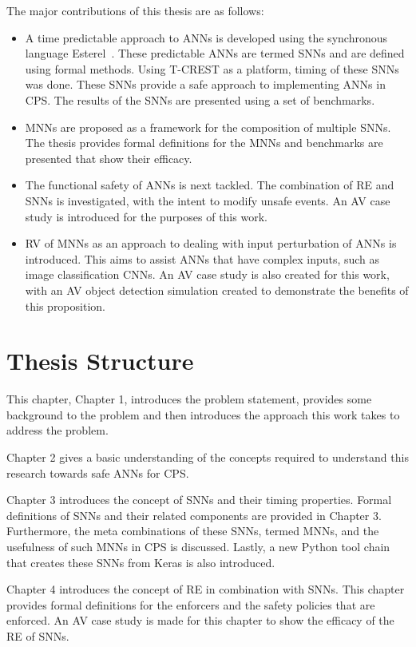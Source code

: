 The major contributions of this thesis are as follows:
\begin{itemize}
	\item A time predictable approach to \acp{ANN} is developed using the synchronous language Esterel~\cite{berry2000foundations}. These predictable \acp{ANN} are termed \acfp{SNN} and are defined using formal methods. Using T-CREST as a platform, timing of these \acp{SNN} was done. These \acp{SNN} provide a safe approach to implementing \acp{ANN} in \ac{CPS}. The results of the \acp{SNN} are presented using a set of benchmarks. 
	\item \acfp{MNN} are proposed as a framework for the composition of multiple \acp{SNN}. The thesis provides formal definitions for the \acp{MNN} and benchmarks are presented that show their efficacy. 
	\item The functional safety of \acp{ANN} is next tackled. The combination of \acf{RE} and \acp{SNN} is investigated, with the intent to modify unsafe events. An \acf{AV} case study is introduced for the purposes of this work.
	\item \acf{RV} of \acp{MNN} as an approach to dealing with input perturbation of \acp{ANN} is introduced. This aims to assist \acp{ANN} that have complex inputs, such as image classification \acfp{CNN}. An \ac{AV} case study is also created for this work, with an \ac{AV} object detection simulation created to demonstrate the benefits of this proposition. 
\end{itemize}

\section{Thesis Structure}
This chapter, Chapter 1, introduces the problem statement, provides some background to the problem and then introduces the approach this work takes to address the problem.

Chapter 2 gives a basic understanding of the concepts required to understand this research towards safe \acp{ANN} for \ac{CPS}.

Chapter 3 introduces the concept of \acfp{SNN} and their timing properties.
Formal definitions of \acp{SNN} and their related components are provided in Chapter 3.
Furthermore, the meta combinations of these \acp{SNN}, termed \acp{MNN}, and the usefulness of such \acp{MNN} in \ac{CPS} is discussed.
Lastly, a new Python tool chain that creates these \acp{SNN} from Keras is also introduced.

Chapter 4 introduces the concept of \acf{RE} in combination with \acp{SNN}. 
This chapter provides formal definitions for the enforcers and the safety policies that are enforced.
An \acf{AV} case study is made for this chapter to show the efficacy of the \ac{RE} of \acp{SNN}.

